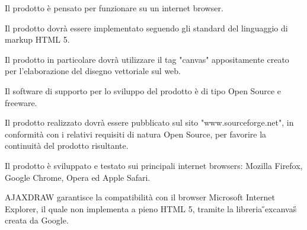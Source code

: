 \begin{elenconumerato}{\subsubsecindent}
\item Il prodotto \`e pensato per funzionare su un internet browser.
\item Il prodotto dovr\`a essere implementato seguendo gli standard del linguaggio di markup HTML 5.
\item Il prodotto in particolare dovr\` a utilizzare il tag "canvas" appositamente creato per l'elaborazione del disegno vettoriale sul web.
\item Il software di supporto per lo sviluppo del prodotto \`e di tipo Open Source e freeware.
\item Il prodotto realizzato dovr\`a essere pubblicato sul sito "www.sourceforge.net", in conformit\`a con i relativi requisiti di natura Open Source, per favorire la continuit\`a del prodotto risultante.
\item Il prodotto \`e sviluppato e testato sui principali internet browsers: Mozilla Firefox, Google Chrome, Opera ed Apple Safari.
\end{elenconumerato}
\begin{elenconumerato}{\subsubsecindent}
\item{AJAXDRAW garantisce la compatibilit\`a con il browser Microsoft Internet Explorer, il quale non implementa a pieno HTML 5, tramite la libreria \H{}excanvas\H{} creata da Google.}
\end{elenconumerato}


\newpage
